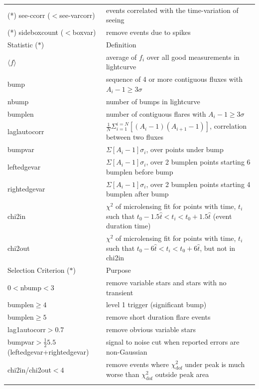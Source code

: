 \documentclass[iop, apj]{emulateapj}
\newcommand{\?}{\stackrel{?}{=}}
\begin{document}
\begin{table}[t]
\begin{center}
\begin{tabular}{ll}
(*) see-ccorr ($<$see-varcorr) & events correlated with the time-variation of seeing\\
(*) sideboxcount ($<$boxvar) & remove events due to spikes\\
 \hline 
 \hline 
   \multicolumn{1}{l}{Statistic ($*$)}&\multicolumn{1}{l}{Definition}\\
 \hline 
$\langle f\rangle$ & average of $f_i$ over all good measurements in lightcurve\\
bump & sequence of 4 or more contiguous fluxes with $A_i-1 \geq 3\sigma$\\
nbump & number of bumps in lightcurve\\
bumplen & number of contiguous flares with $A_i-1 \geq 3\sigma$\\
laglautocorr & $\frac{1}{N}\Sigma^{i=N}_{i=1}[(A_i-1)(A_{i+1}-1)]$, correlation between two fluxes\\
bumpvar & $\Sigma [A_i-1]\sigma_i$, over points under bump\\
leftedgevar & $\Sigma [A_i-1]\sigma_i$, over 2 bumplen points starting 6 bumplen before bump\\
rightedgevar & $\Sigma [A_i-1]\sigma_i$, over 2 bumplen points starting 4 bumplen after bump\\
chi2in &  $\chi^2$ of microlensing fit for points with time, $t_i$ such that $t_0-1.5\hat t <t_i <t_0+1.5\hat t$ (event duration time)\\
chi2out &  $\chi^2$ of microlensing fit for points with time, $t_i$ such that $t_0-6\hat t <t_i <t_0+6\hat t$, but not in chi2in\\
 \hline 
 \hline 
   \multicolumn{1}{l}{Selection Criterion ($*$)}&\multicolumn{1}{l}{Purpose}\\
 \hline 
$0<$nbump$<3$ & remove variable stars and stars with no transient\\
bumplen$\geq 4$ & level 1 trigger (significant bump)\\
bumplen$\geq 5$ & remove short duration flare events\\
lag1autocorr$>0.7$ & remove obvious variable stars\\
bumpvar$>\frac{1}{2}5.5$ (leftedgevar+rightedgevar) & signal to noise cut when reported errors are non-Gaussian\\
chi2in/chi2out$<4$ & remove events where $\chi^2_\mathrm{dof}$ under peak is much worse than $\chi^2_\mathrm{dof}$ outside peak area\\
 \hline 
   \label{table:counta}
  	\end{tabular}
	   \end{center}
   \end{table}
%
\end{document}
